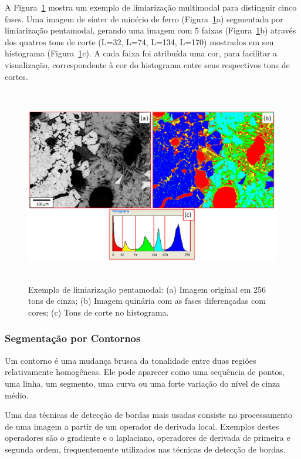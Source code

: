 A Figura~\ref{fig:2-6} mostra um exemplo de limiarização multimodal
para distinguir cinco fases. Uma imagem de sínter de minério de ferro
(Figura~\ref{fig:2-6}a) segmentada por limiarização pentamodal,
gerando uma imagem com 5 faixas (Figura~\ref{fig:2-6}b) através dos
quatros tons de corte (L=32, L=74, L=134, L=170) mostrados em seu
histograma (Figura~\ref{fig:2-6}c). A cada faixa foi atribuída uma
cor, para facilitar a visualização, correspondente à cor do histograma
entre seus respectivos tons de cortes.
 
 
\begin{figure} [h]
  \begin{center}
    \includegraphics[height=243pt,width=400pt]{images/fig2-6}
    \caption{Exemplo de limiarização pentamodal: (a) Imagem original
      em 256 tons de cinza; (b) Imagem quinária com as fases
      diferençadas com cores; (c) Tons de corte no
      histograma.\cite{74}}\label{fig:2-6}
  \end{center}
\end{figure}

\vspace{20 mm}

\subsubsection{Segmentação por Contornos}

Um contorno é uma mudança brusca da tonalidade entre duas regiões
relativamente homogêneas. Ele pode aparecer como uma sequência de
pontos, uma linha, um segmento, uma curva ou uma forte variação do
nível de cinza médio.\cite{88}

Uma das técnicas de detecção de bordas mais usadas consiste no
processamento de uma imagem a partir de um operador de derivada
local. Exemplos destes operadores são o gradiente e o laplaciano,
operadores de derivada de primeira e segunda ordem, frequentemente
utilizados nas técnicas de detecção de bordas.\cite{88}

